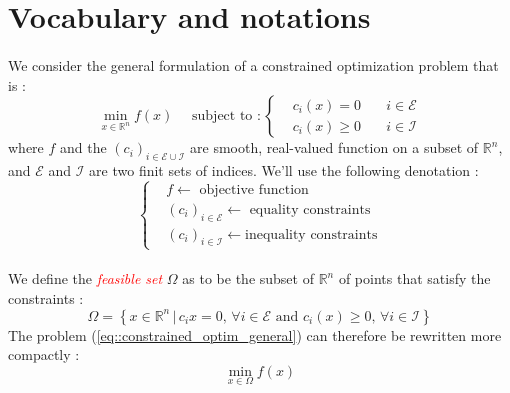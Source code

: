 \documentclass[a4paper]{article}
\begin{document}
	
		
	\vhrulefill{2pt}
	
	\tableofcontents
	
	\vhrulefill{2pt}

	\section{Vocabulary and notations}
	{
		\paragraph{} We consider the general formulation of a constrained optimization problem that is : 
		\begin{equation}
			\label{eq::constrained_optim_general}
			\min_{x\in\mathbb{R}^n} f(x)  \quad \text{ subject to } : 
				\left\{ \begin{aligned} 
						&c_i(x) = 0 \quad &i\in\mathcal{E} \\
						&c_i(x) \geq 0 \quad &i\in\mathcal{I}
					\end{aligned}\right.
		\end{equation}
		where $f$ and the $(c_i)_{i\in\mathcal{E}\cup\mathcal{I}}$ are smooth, real-valued function on a subset of $\mathbb{R}^n$, and $\mathcal{E}$ and $\mathcal{I}$ are two finit sets of indices. We'll use the following denotation : 
		\begin{equation}
			\left\{ \begin{aligned}
				&f \leftarrow \text{ objective function}\\
				&(c_i)_{i\in\mathcal{E}} \leftarrow \text{ equality constraints}\\
				&(c_i)_{i\in\mathcal{I}} \leftarrow \text{inequality constraints}
				\end{aligned}\right.
		\end{equation}
		
		\paragraph{} We define the \textcolor{red}{\emph{feasible set}} $\Omega$ as to be the subset of $\mathbb{R}^n$ of points that satisfy the constraints : 
		\begin{equation}
			\label{eq::feasible_set}
			\Omega = \left\{ x \in \mathbb{R}^n \, \vert \, c_i{x} = 0, \, \forall{i}\in\mathcal{E} \text{ and } c_i(x) \geq 0, \, \forall{i}\in\mathcal{I} \right\} 
		\end{equation}
		The problem (\ref{eq::constrained_optim_general}) can therefore be rewritten more compactly : 
		\begin{equation}
			\min_{x\in\Omega} f(x) 
		\end{equation}
		
}
\end{document}
